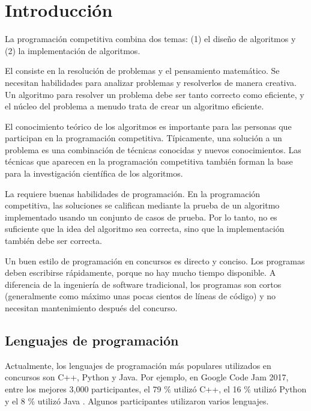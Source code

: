 \chapter{Introducción}

La programación competitiva combina dos temas:
(1) el diseño de algoritmos y (2) la implementación de algoritmos.

El  consiste en la resolución de problemas
y el pensamiento matemático.
Se necesitan habilidades para analizar problemas y resolverlos
de manera creativa.
Un algoritmo para resolver un problema
debe ser tanto correcto como eficiente,
y el núcleo del problema a menudo
trata de crear un algoritmo eficiente.

El conocimiento teórico de los algoritmos
es importante para las personas que participan en la programación competitiva.
Típicamente, una solución a un problema es
una combinación de técnicas conocidas y
nuevos conocimientos.
Las técnicas que aparecen en la programación competitiva
también forman la base para la investigación científica
de los algoritmos.

La  requiere buenas
habilidades de programación.
En la programación competitiva, las soluciones
se califican mediante la prueba de un algoritmo implementado
usando un conjunto de casos de prueba.
Por lo tanto, no es suficiente que la idea del
algoritmo sea correcta, sino que la implementación también
debe ser correcta.

Un buen estilo de programación en concursos es
directo y conciso.
Los programas deben escribirse rápidamente,
porque no hay mucho tiempo disponible.
A diferencia de la ingeniería de software tradicional,
los programas son cortos (generalmente como máximo unas
pocas cientos de líneas de código) y no necesitan
mantenimiento después del concurso.

\section{Lenguajes de programación}


Actualmente, los lenguajes de programación más populares
utilizados en concursos son C++, Python y Java.
Por ejemplo, en Google Code Jam 2017,
entre los mejores 3,000 participantes,
el 79 \% utilizó C++,
el 16 \% utilizó Python y
el 8 \% utilizó Java \cite{goo17}.
Algunos participantes utilizaron varios lenguajes.

